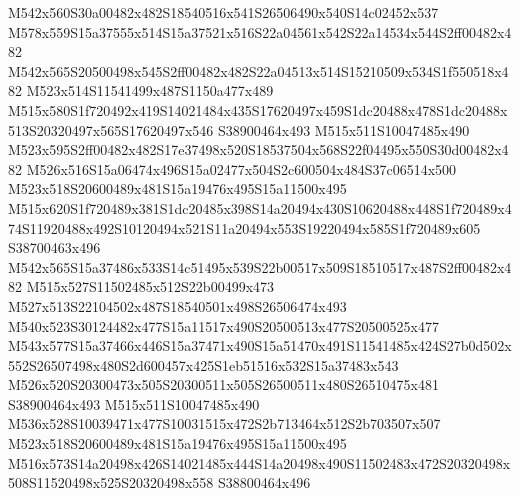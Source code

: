 \documentclass{article}
\begin{document}
\begin{multicols}{2}



M542x560S30a00482x482S18540516x541S26506490x540S14c02452x537 M578x559S15a37555x514S15a37521x516S22a04561x542S22a14534x544S2ff00482x482 M542x565S20500498x545S2ff00482x482S22a04513x514S15210509x534S1f550518x482 M523x514S11541499x487S1150a477x489 M515x580S1f720492x419S14021484x435S17620497x459S1dc20488x478S1dc20488x513S20320497x565S17620497x546 S38900464x493 M515x511S10047485x490 M523x595S2ff00482x482S17e37498x520S18537504x568S22f04495x550S30d00482x482 M526x516S15a06474x496S15a02477x504S2c600504x484S37c06514x500 M523x518S20600489x481S15a19476x495S15a11500x495 M515x620S1f720489x381S1dc20485x398S14a20494x430S10620488x448S1f720489x474S11920488x492S10120494x521S11a20494x553S19220494x585S1f720489x605 S38700463x496 M542x565S15a37486x533S14c51495x539S22b00517x509S18510517x487S2ff00482x482 M515x527S11502485x512S22b00499x473 M527x513S22104502x487S18540501x498S26506474x493 M540x523S30124482x477S15a11517x490S20500513x477S20500525x477 M543x577S15a37466x446S15a37471x490S15a51470x491S11541485x424S27b0d502x552S26507498x480S2d600457x425S1eb51516x532S15a37483x543 M526x520S20300473x505S20300511x505S26500511x480S26510475x481 S38900464x493 M515x511S10047485x490 M536x528S10039471x477S10031515x472S2b713464x512S2b703507x507 M523x518S20600489x481S15a19476x495S15a11500x495 M516x573S14a20498x426S14021485x444S14a20498x490S11502483x472S20320498x508S11520498x525S20320498x558 S38800464x496





\end{multicols}
\end{document}
